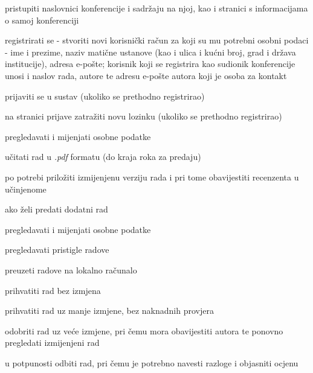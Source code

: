 			
			\begin{packed_enum}
					\item  {}
				
				\begin{packed_enum}
					
					\item pristupiti naslovnici konferencije i sadržaju na njoj, kao i stranici s informacijama o samoj konferenciji
					\item registrirati se - stvoriti novi korisnički račun za koji su mu potrebni osobni podaci - ime i prezime, naziv matične ustanove (kao i ulica i kućni broj, grad i država institucije), adresa e-pošte; korisnik koji se registrira kao sudionik konferencije unosi i naslov rada, autore te adresu e-pošte autora koji je osoba za kontakt 
					\item prijaviti se u sustav (ukoliko se prethodno registrirao)
					\item na stranici prijave zatražiti novu lozinku (ukoliko se prethodno registrirao)
					
				\end{packed_enum}
			 	\item  {}
			 
			 	\begin{packed_enum}
					\item  {}
				
					\begin{packed_enum}
					
						\item pregledavati i mijenjati osobne podatke 
						\item učitati rad u \textit{.pdf} formatu (do kraja roka za predaju)
						\item po potrebi priložiti izmijenjenu verziju rada i pri tome obavijestiti recenzenta u učinjenome
						\item ako želi predati dodatni rad 
					
					
					\end{packed_enum}
				
					\item  {}
				
					\begin{packed_enum}
					
						\item pregledavati i mijenjati osobne podatke 
						\item pregledavati pristigle radove
						\item preuzeti radove na lokalno računalo
						\item prihvatiti rad bez izmjena
						\item prihvatiti rad uz manje izmjene, bez naknadnih provjera
						\item odobriti rad uz veće izmjene, pri čemu mora obavijestiti autora te ponovno pregledati izmijenjeni rad
						\item u potpunosti odbiti rad, pri čemu je potrebno navesti razloge i objasniti ocjenu
					

\end{packed_enum}
\end{packed_enum}
\end{packed_enum}
